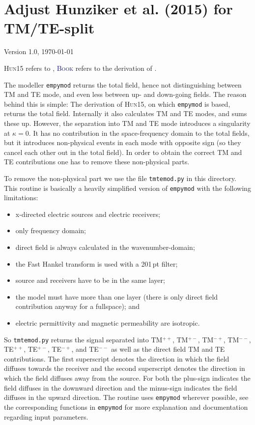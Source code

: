 \documentclass[fontsize=9pt, parskip=half, notitlepage, fleqn]{scrartcl}
\newcommand{\bkcol}[1]{\textcolor{MidnightBlue}{#1\xspace}}
\newcommand{\hun}{\textsc{Hun15}\xspace}
\newcommand{\book}{\bkcol{\textsc{Book}}\xspace}
\newcommand{\empymod}{\texttt{empymod}\xspace}
\newcommand{\tmtemod}{\texttt{tmtemod.py}\xspace}
\begin{document}
\setlength{\jot}{10pt}  %

\section*{Adjust Hunziker et al. (2015) for TM/TE-split}

{\ttfamily \small Version 1.0, \today

\hun refers to \cite{GEO.15.Hunziker}, \book refers to the derivation of
\cite{CUP.17.Ziolkowski}.}

The modeller \empymod returns the total field, hence not distinguishing between
TM and TE mode, and even less between up- and down-going fields. The reason
behind this is simple: The derivation of \hun, on which \empymod is based,
returns the total field. Internally it also calculates TM and TE modes, and
sums these up. However, the separation into TM and TE mode introduces a
singularity at $\kappa = 0$. It has no contribution in the space-frequency
domain to the total fields, but it introduces non-physical events in each mode
with opposite sign (so they cancel each other out in the total field). In
order to obtain the correct TM and TE contributions one has to remove these
non-physical parts.

To remove the non-physical part we use the file \tmtemod in this
directory. This routine is basically a heavily simplified version of \empymod
with the following limitations:
\begin{itemize}
  \item x-directed electric sources and electric receivers;
  \item only frequency domain;
  \item direct field is always calculated in the wavenumber-domain;
  \item the Fast Hankel transform is used with a 201\,pt filter;
  \item source and receivers have to be in the same layer;
  \item the model must have more than one layer (there is only direct field
    contribution anyway for a fullspace); and
  \item electric permittivity and magnetic permeability are isotropic.
\end{itemize}

So \tmtemod returns the signal separated into TM$^{++}$, TM$^{+-}$, TM$^{-+}$,
TM$^{--}$, TE$^{++}$, TE$^{+-}$, TE$^{-+}$, and TE$^{--}$ as well as the direct
field TM and TE contributions. The first superscript denotes the direction in
which the field diffuses towards the receiver and the second superscript
denotes the direction in which the field diffuses away from the source. For
both the plus-sign indicates the field diffuses in the downward direction and
the minus-sign indicates the field diffuses in the upward direction. The
routine uses \empymod wherever possible, see the corresponding functions in
\empymod for more explanation and documentation regarding input parameters.
\end{document}
